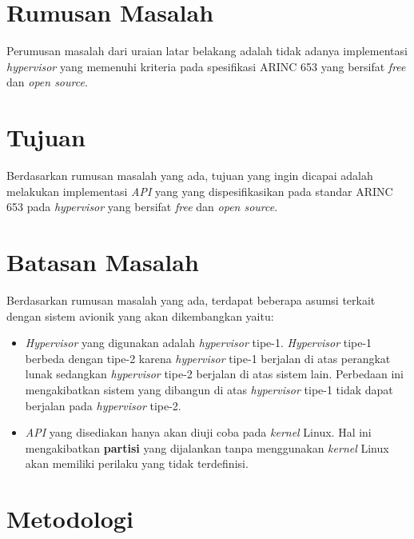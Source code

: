 \section{Rumusan Masalah}

Perumusan masalah dari uraian latar belakang adalah tidak adanya implementasi \textit{hypervisor} yang memenuhi kriteria
pada spesifikasi ARINC 653 yang bersifat \textit{free} dan \textit{open source}.

\section{Tujuan}

Berdasarkan rumusan masalah yang ada, tujuan yang ingin dicapai adalah melakukan implementasi \textit{API} yang
yang dispesifikasikan pada standar ARINC 653 pada \textit{hypervisor} yang bersifat \textit{free} dan \textit{open
source}.

\section{Batasan Masalah}
\label{section:batasan_masalah}

Berdasarkan rumusan masalah yang ada, terdapat beberapa asumsi terkait dengan sistem avionik yang akan
dikembangkan yaitu:

\begin{itemize}

    \item \textit{Hypervisor} yang digunakan adalah \textit{hypervisor} tipe-1. \textit{Hypervisor} tipe-1 berbeda
        dengan tipe-2 karena \textit{hypervisor} tipe-1 berjalan di atas perangkat lunak sedangkan \textit{hypervisor}
        tipe-2 berjalan di atas sistem lain. Perbedaan ini mengakibatkan sistem yang dibangun di atas
        \textit{hypervisor} tipe-1 tidak dapat berjalan pada \textit{hypervisor} tipe-2.

    \item \textit{API} yang disediakan hanya akan diuji coba pada \textit{kernel} Linux. Hal ini mengakibatkan
        \textbf{partisi} yang dijalankan tanpa menggunakan \textit{kernel} Linux akan memiliki perilaku yang tidak
        terdefinisi.

\end{itemize}

\section{Metodologi}

